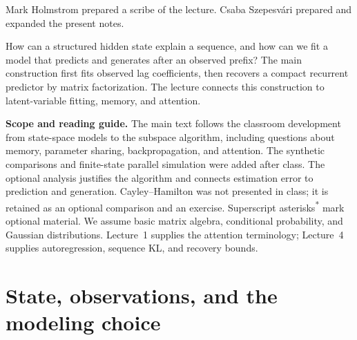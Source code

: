 \documentclass[11pt,twoside]{article}
\newcommand{\suppmark}{\texorpdfstring{\textsuperscript{*}}{*}}
\theoremstyle{definition}
\theoremstyle{remark}
\begin{document}
\begin{center}
\end{center}

\noindent Mark Holmstrom prepared a scribe of the lecture. Csaba Szepesv\'ari
prepared and expanded the present notes.

\medskip
How can a structured hidden state explain a sequence, and how can we fit a
model that predicts and generates after an observed prefix? The main
construction first fits observed lag coefficients, then recovers a compact
recurrent predictor by matrix factorization. The lecture connects this
construction to latent-variable fitting, memory, and attention.

\noindent\textbf{Scope and reading guide.}
The main text follows the classroom development from state-space models to
the subspace algorithm, including questions about memory, parameter sharing,
backpropagation, and attention. The synthetic comparisons and finite-state
parallel simulation were added after class. The optional analysis justifies
the algorithm and connects estimation
error to prediction and generation. Cayley--Hamilton was not presented in
class; it is retained as an optional comparison and an exercise. Superscript
asterisks\suppmark{} mark optional material.
We assume basic matrix algebra, conditional probability, and Gaussian
distributions. Lecture~1 supplies the attention terminology; Lecture~4
supplies autoregression, sequence KL, and recovery bounds.

\section{State, observations, and the modeling choice}
\label{sec:state-space}
\end{document}
